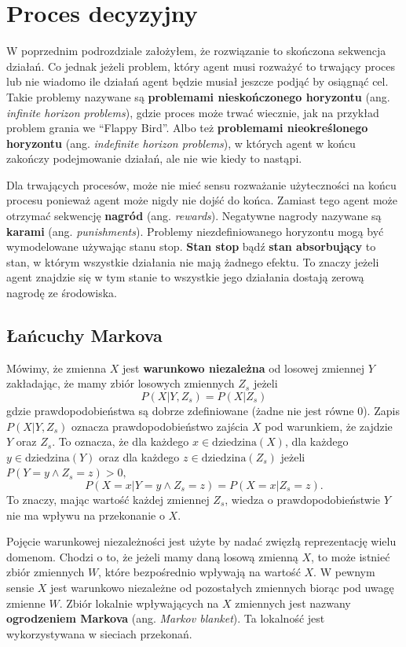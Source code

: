 \documentclass[a4paper, 12pt,oneside]{book}
\begin{document}
\section{Proces decyzyjny}
W poprzednim podrozdziale założyłem, że rozwiązanie to skończona sekwencja
działań. Co jednak jeżeli problem, który agent musi rozważyć to trwający
proces lub nie wiadomo ile działań agent będzie musiał jeszcze podjąć by
osiągnąć cel. Takie problemy nazywane
są \textbf{problemami nieskończonego horyzontu} (ang. \textit{infinite horizon
problems}), gdzie proces może trwać wiecznie, jak na przykład problem grania
we ``Flappy Bird''. Albo też \textbf{problemami nieokreślonego horyzontu} (ang.
\textit{indefinite horizon problems}), w których agent w końcu zakończy
podejmowanie działań, ale nie wie kiedy to nastąpi.

Dla trwających procesów, może nie mieć sensu rozważanie użyteczności na końcu
procesu ponieważ agent może nigdy nie dojść do końca. Zamiast tego agent może
otrzymać sekwencję \textbf{nagród} (ang. \textit{rewards}).
Negatywne nagrody nazywane są \textbf{karami} (ang. \textit{punishments}).
Problemy niezdefiniowanego horyzontu mogą być wymodelowane używając stanu
stop. \textbf{Stan stop} bądź \textbf{stan absorbujący} to stan, w którym
wszystkie działania nie mają żadnego efektu. To znaczy jeżeli agent znajdzie
się w tym stanie to wszystkie jego działania dostają zerową nagrodę ze
środowiska.

\subsection{Łańcuchy Markova}
Mówimy, że zmienna $X$ jest \textbf{warunkowo niezależna} od losowej zmiennej
$Y$ zakładając, że mamy zbiór losowych zmiennych $Z_s$ jeżeli
\[P(X | Y, Z_s) = P(X| Z_s)\]
gdzie prawdopodobieństwa są dobrze zdefiniowane (żadne nie jest równe $0$).
Zapis $P(X| Y, Z_s)$ oznacza prawdopodobieństwo zajścia $X$ pod
warunkiem, że zajdzie $Y$ oraz $Z_s$. To oznacza, że dla każdego $x \in
\text{dziedzina}(X)$, dla każdego $y \in \text{dziedzina}(Y)$ oraz dla każdego
$z \in \text{dziedzina}(Z_s)$ jeżeli $P(Y = y \wedge Z_s = z) > 0,$
\[P(X=x|Y=y \wedge Z_s = z) = P(X=x|Z_s = z).\]
To znaczy, mając wartość każdej zmiennej $Z_s$, wiedza o prawdopodobieństwie
$Y$ nie ma wpływu na przekonanie o $X$.

Pojęcie warunkowej niezależności jest użyte by nadać zwięzłą reprezentację
wielu domenom. Chodzi o to, że jeżeli mamy daną losową zmienną $X$, to może
istnieć zbiór zmiennych $W$, które bezpośrednio wpływają na wartość $X$. W
pewnym sensie $X$ jest warunkowo niezależne od pozostałych zmiennych biorąc pod
uwagę  zmienne $W$. Zbiór lokalnie wpływających na $X$ zmiennych jest nazwany
\textbf{ogrodzeniem Markova} (ang. \textit{Markov blanket}). Ta lokalność
jest wykorzystywana w sieciach przekonań\cite{ai_foundations_belief_networks}.
\end{document}
